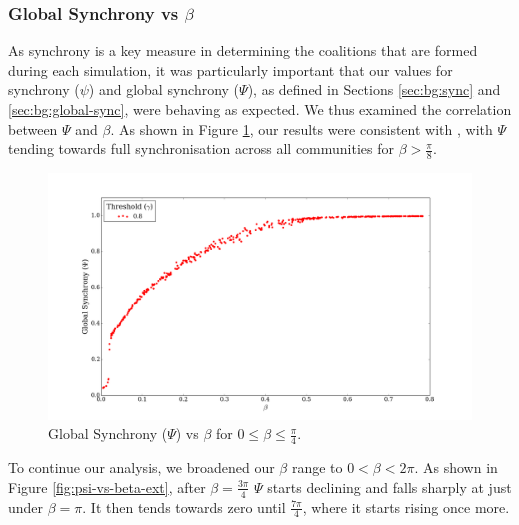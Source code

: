 \documentclass[a4paper,11pt]{article}
\begin{document}
\subsubsection{Global Synchrony vs $\beta$}
\label{sec:app:osc:res:sync-v-beta}

As synchrony is a key measure in determining the coalitions that are formed during each simulation, it was particularly important that our values for synchrony ($\psi$) and global synchrony ($\Psi$), as defined in Sections \ref{sec:bg:sync} and \ref{sec:bg:global-sync}, were behaving as expected. We thus examined the correlation between $\Psi$ and $\beta$. As shown in Figure \ref{fig:psi-vs-beta-orig}, our results were consistent with \cite{Shanahan2010}, with $\Psi$ tending towards full synchronisation across all communities for $\beta > \frac{\pi}{8}$.

\begin{figure}[H]
\begin{center}
\includegraphics[scale = 0.35]{figures/psi_vs_beta_orig}
\caption{
	Global Synchrony ($\Psi$) vs $\beta$ for $0 \leq \beta \leq \frac{\pi}{4}$.
	\label{fig:psi-vs-beta-orig}
}
\end{center}
\end{figure}

To continue our analysis, we broadened our $\beta$ range to $0 < \beta < 2\pi$. As shown in Figure \ref{fig:psi-vs-beta-ext}, after $\beta = \frac{3\pi}{4}$ $\Psi$ starts declining and falls sharply at just under $\beta = \pi$. It then tends towards zero until $\frac{7\pi}{4}$, where it starts rising once more.
\end{document}
